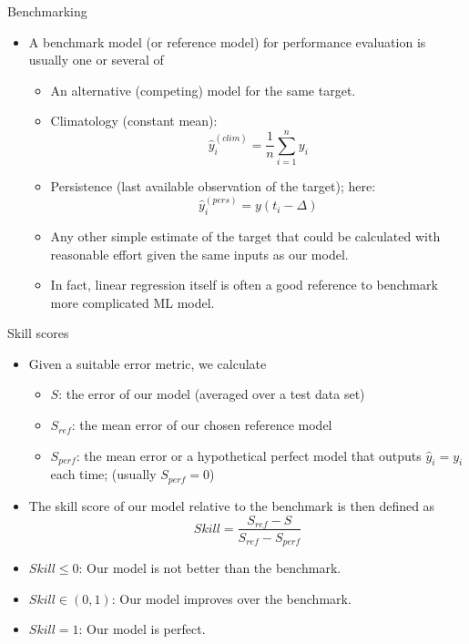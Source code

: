 \documentclass{beamer}
\begin{document}
\begin{frame}{Benchmarking}
\begin{itemize}
\item A benchmark model (or reference model) for performance evaluation is usually one or several of
\begin{itemize}
\item An alternative (competing) model for the same target.
\item Climatology (constant mean): \[\hat{y}^{(clim)}_i = \frac1n \sum_{i=1}^n y_i\]
\item Persistence (last available observation of the target); here: \[\hat{y}^{(pers)}_i = y(t_i - \Delta)\]
\item Any other simple estimate of the target that could be calculated with reasonable effort given the same inputs as our model.
\item In fact, linear regression itself is often a good reference to benchmark more complicated ML model.
\end{itemize}
\end{itemize}
\end{frame}

\begin{frame}{Skill scores}
\begin{itemize}
\item Given a suitable error metric, we calculate
\begin{itemize}
\item \(S\): the error of our model (averaged over a test data set)
\item \(S_{ref}\): the mean error of our chosen reference model 
\item \(S_{perf}\): the mean error or a hypothetical perfect model that outputs \(\hat{y}_i = y_i\) each time; (usually \(S_{perf} = 0\))
\end{itemize}
\item The skill score of our model relative to the benchmark is then defined as
\[Skill = \frac{S_{ref} - S}{S_{ref} - S_{perf}}\]
\item \(Skill \le 0\): Our model is not better than the benchmark.
\item \(Skill \in (0, 1)\): Our model improves over the benchmark. 
\item \(Skill = 1\): Our model is perfect.
\end{itemize}
\end{frame}
\end{document}
